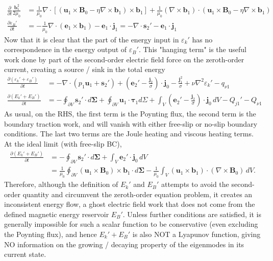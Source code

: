 %
\[
\begin{aligned}
    \frac{\partial}{\partial t} \frac{\mathbf{b}_1^2}{2 \mu_0} &= \frac{1}{\mu_0}\nabla\cdot \left[(\mathbf{u}_1\times \mathbf{B}_0 - \eta \nabla\times \mathbf{b}_1)\times \mathbf{b}_1\right] + \frac{1}{\mu_0}(\nabla\times \mathbf{b}_1)\cdot \left(\mathbf{u}_1\times \mathbf{B}_0 - \eta \nabla\times \mathbf{b}_1\right) \\ 
    \frac{\partial \varepsilon_B'}{\partial t} &= - \frac{1}{\mu_0}\nabla\cdot \left(\mathbf{e}_1\times \mathbf{b}_1 \right) - \mathbf{e}_1 \cdot \mathbf{j}_1 = - \nabla\cdot \mathbf{s}_2' - \mathbf{e}_1\cdot \mathbf{j}_1
\end{aligned}
\]
%
Now that it is clear that the part of the energy input in $\varepsilon_k'$ has no correspondence in the energy output of $\varepsilon_B'$. This "hanging term" is the useful work done by part of the second-order electric field force on the zeroth-order current, creating a source / sink in the total energy
%
\[\begin{aligned}
    \frac{\partial (\varepsilon_k' + \varepsilon_B')}{\partial t} &= - \nabla\cdot \left(p_1 \mathbf{u}_1 + \mathbf{s}_2' \right) + \left(\mathbf{e}_2' - \frac{\mathbf{j}_2}{\sigma}\right)\cdot \mathbf{j}_0 - \frac{\mathbf{j}_1^2}{\sigma} + \nu \nabla^2 \varepsilon_k' - q_{\nu 1} \\ 
    \frac{\partial (E_k' + E_B')}{\partial t} &= - \oint_{\partial V} \mathbf{s}_2' \cdot d\boldsymbol{\Sigma} + \oint_{\partial V} \mathbf{u}_1\cdot \boldsymbol{\tau}_1 d\Sigma + \int_V \left(\mathbf{e}_2' - \frac{\mathbf{j}_2}{\sigma}\right)\cdot \mathbf{j}_0 \, dV - Q_{j1}' - Q_{\nu 1}
\end{aligned}\]
%
As usual, on the RHS, the first term is the Poynting flux, the second term is the boundary traction work, and will vanish with either free-slip or no-slip boundary conditions. The last two terms are the Joule heating and viscous heating terms. At the ideal limit (with free-slip BC), 
%
\[\begin{aligned}
    \frac{\partial (E_k' + E_B')}{\partial t} &= - \oint_{\partial V} \mathbf{s}_2' \cdot d\boldsymbol{\Sigma} + \int_V \mathbf{e}_2'\cdot \mathbf{j}_0 \, dV \\
    &= \frac{1}{\mu_0} \oint_{\partial V} (\mathbf{u}_1 \times \mathbf{B}_0) \times \mathbf{b}_1 \cdot d\boldsymbol{\Sigma} - \frac{1}{\mu_0}\int_V (\mathbf{u}_1 \times \mathbf{b}_1)\cdot (\nabla\times \mathbf{B}_0) \, dV.
\end{aligned}\]
%
Therefore, although the definition of $E_k'$ and $E_B'$ attempts to avoid the second-order quantity and circumvent the zeroth-order equation problem, it creates an inconsistent energy flow, a ghost electric field work that does not come from the defined magnetic energy reservoir $E_B'$.
Unless further conditions are satisfied, it is generally impossible for such a scalar function to be conservative (even excluding the Poynting flux), and hence $E_k' + E_B'$ is also NOT a Lyapunov function, giving NO information on the growing / decaying property of the eigenmodes in its current state.


